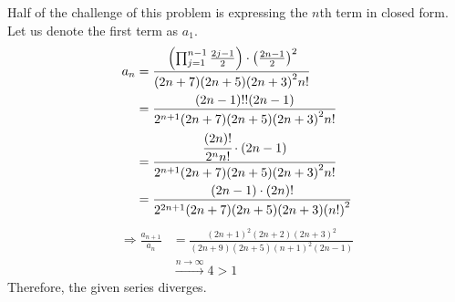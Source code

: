 \item

Half of the challenge of this problem is expressing the $n$th term in closed form.
Let us denote the first term as $a_1$.
\begin{align*}
	a_n
	 & = \cfrac{
		\left( \prod_{j = 1}^{n - 1} \frac{2j - 1}{2} \right) \cdot {\left( \frac{2n - 1}{2} \right)}^2
	}{
		(2n + 7) (2n + 5) {(2n + 3)}^2 n!
	}                                                                                              \\
	 & = \frac{(2n - 1)!! (2n - 1)}{2^{n + 1} (2n + 7) (2n + 5) {(2n + 3)}^2 n!}                   \\
	 & = \cfrac{\cfrac{(2n)!}{2^n n!} \cdot (2n - 1)}{2^{n + 1} (2n + 7) (2n + 5) {(2n + 3)}^2 n!} \\
	 & = \frac{(2n - 1) \cdot (2n)!}{2^{2n + 1} (2n + 7) (2n + 5) (2n + 3) {(n!)}^2}
\end{align*}
\begin{align*}
	\Rightarrow \frac{a_{n + 1}}{a_n}
	 & = \frac{{(2n + 1)}^2 (2n + 2) {(2n + 3)}^2}{(2n + 9) (2n + 5) {(n + 1)}^2 (2n - 1)} \\
	 & \xrightarrow{n \rightarrow \infty} 4 > 1
\end{align*}
Therefore, the given series diverges.